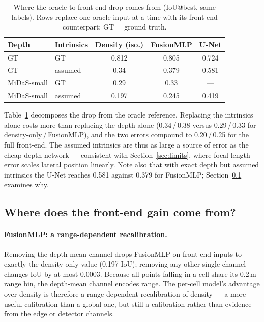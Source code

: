 \documentclass[sigconf]{acmart}
\newenvironment{revised}{\color{revcolor}}{}
\begin{document}
\begin{revised}
\begin{table}[t]
\caption{Where the oracle-to-front-end drop comes from (IoU@best, same labels). Rows replace one oracle input at a time with its front-end counterpart; GT = ground truth.}
\label{tab:decomp}
\setlength{\tabcolsep}{4pt}
\begin{tabular}{llccc}
\toprule
Depth & Intrinsics & Density (iso.) & FusionMLP & U-Net \\
\midrule
GT & GT & 0.812 & 0.805 & 0.724 \\
GT & assumed & 0.34 & 0.379 & 0.581 \\
MiDaS-small & GT & 0.29 & 0.33 & --- \\
MiDaS-small & assumed & 0.197 & 0.245 & 0.419 \\
\bottomrule
\end{tabular}
\end{table}

Table~\ref{tab:decomp} decomposes the drop from the oracle reference. Replacing the intrinsics alone costs more than replacing the depth alone (0.34\,/\,0.38 versus 0.29\,/\,0.33 for density-only\,/\,FusionMLP), and the two errors compound to 0.20\,/\,0.25 for the full front-end. The assumed intrinsics are thus as large a source of error as the cheap depth network --- consistent with Section~\ref{sec:limits}, where focal-length error scales lateral position linearly. Note also that with exact depth but assumed intrinsics the U-Net reaches 0.581 against 0.379 for FusionMLP; Section~\ref{sec:where} examines why.

\subsection{Where does the front-end gain come from?}\label{sec:where}

\paragraph{FusionMLP: a range-dependent recalibration.} Removing the depth-mean channel drops FusionMLP on front-end inputs to exactly the density-only value (0.197 IoU); removing any other single channel changes IoU by at most 0.0003. Because all points falling in a cell share its 0.2\,m range bin, the depth-mean channel encodes range. The per-cell model's advantage over density is therefore a range-dependent recalibration of density --- a more useful calibration than a global one, but still a calibration rather than evidence from the edge or detector channels.


\end{revised}
\end{document}
